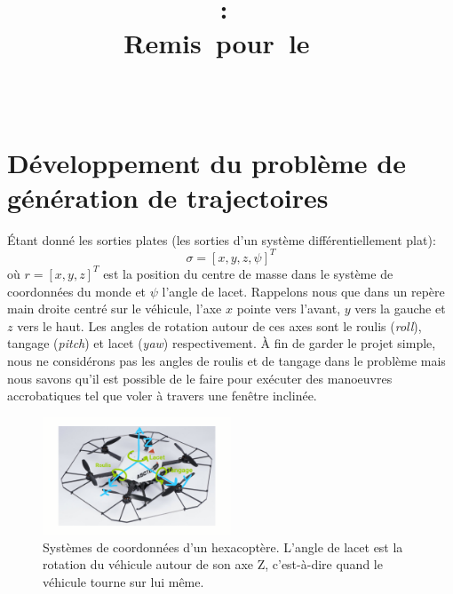 \documentclass{article}
\title{
    \vspace{2in}
    \textmd{\textbf{\hmwkClass:\ \hmwkTitle}}\\
    \normalsize\vspace{0.1in}\small{Remis\ pour\ le\ \hmwkDueDate\ }\\
    \vspace{0.1in}\large{\textit{\hmwkClassInstructor\ \hmwkClassTime}}
    \vspace{3in}
}
\author{\textbf{\hmwkAuthorName}}
\date{}
\begin{document}
\maketitle

\pagebreak


\section{Développement du problème de génération de trajectoires}
Étant donné les sorties plates (les sorties d'un système différentiellement plat):
\begin{equation}
\sigma = [x, y, z, \psi]^T
\end{equation}
où $r = [x, y, z]^T$ est la position du centre de masse dans le système de coordonnées du monde et $\psi$ l'angle de lacet. Rappelons nous que dans un repère main droite centré sur le véhicule, l'axe $x$ pointe vers l'avant, $y$ vers la gauche et $z$ vers le haut. Les angles de rotation autour de ces axes sont le roulis (\textit{roll}), tangage (\textit{pitch}) et lacet (\textit{yaw}) respectivement. À fin de garder le projet simple, nous ne considérons pas les angles de roulis et de tangage dans le problème mais nous savons qu'il est possible de le faire pour exécuter des manoeuvres accrobatiques tel que voler à travers une fenêtre inclinée.

\begin{figure}[h]
	\centering
	\includegraphics[width=0.5\textwidth]{fig/firefly.png}
	\caption{Systèmes de coordonnées d'un hexacoptère. L'angle de lacet est la rotation du véhicule autour de son axe Z, c'est-à-dire quand le véhicule tourne sur lui même.}
\end{figure}
\end{document}
